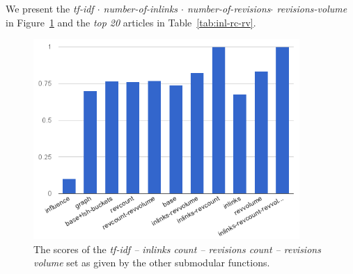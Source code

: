 We present the \emph{tf-idf \(\cdot\) number-of-inlinks \(\cdot\)
number-of-revisions\(\cdot\) revisions-volume} in Figure~\ref{img:inl-rc-rv}
and the \emph{top 20} articles in Table~\ref{tab:inl-rc-rv}.
\begin{figure}
  \centering
  \includegraphics[width=0.9\textwidth,natwidth=555,natheight=419]{images/inl-rc-rv.png}
  \caption{The scores of the \emph{tf-idf -- inlinks count -- revisions count
  -- revisions volume} set as given by the other submodular functions.}
  \label{img:inl-rc-rv}
\end{figure}

